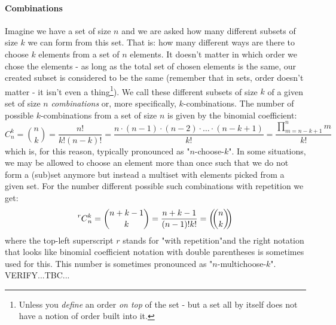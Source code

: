 

\paragraph{Combinations}
Imagine we have a set of size $n$ and we are asked how many different subsets of size $k$ we can form from this set. That is: how many different ways are there to choose $k$ elements from a set of $n$ elements. It doesn't matter in which order we chose the elements - as long as the total set of chosen elements is the same, our created subset is considered to be the same (remember that in sets, order doesn't matter - it isn't even a thing\footnote{Unless you \emph{define} an order \emph{on top} of the set - but a set all by itself does not have a notion of order built into it.}). We call these different subsets of size $k$ of a given set of size $n$ \emph{combinations} or, more specifically, $k$-combinations. The number of possible $k$-combinations from a set of size $n$ is given by the binomial coefficient:
\begin{equation}
C_n^k = \binom{n}{k} 
      = \frac{n!}{k! (n-k)!} 
      = \frac{n \cdot (n-1) \cdot (n-2) \cdot \ldots \cdot (n-k+1)}{k!}
      = \frac{\prod_{m=n-k+1}^{n} m}{k!}
\end{equation}
which is, for this reason, typically pronounced as "$n$-choose-$k$". In some situations, we may be allowed to choose an element more than once such that we do not form a (sub)set anymore but instead a multiset with elements picked from a given set. For the number different possible such combinations with repetition we get:
\begin{equation}
\prescript{r}{}{C}_n^k
= \binom{n+k-1}{k}
= \frac{n+k-1}{(n-1)! k!}
= \left(\!\!{n\choose k}\!\!\right)
\end{equation}
where the top-left superscript $r$ stands for "with repetition"and the right notation that looks like binomial coefficient notation with double parentheses is sometimes used for this. This number is sometimes pronounced as "$n$-multichoose-$k$". VERIFY...TBC...


